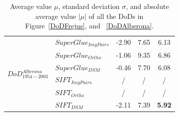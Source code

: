 \begin{table}
\begin{tabular}{||l|l|c|c|c||}
		\multirow{6}{*}{$DoD^{Alberona}_{1954-2003}$}
&${SuperGlue_{ImgPairs}}$ & -2.90 & 7.65 & 6.13\\
&${SuperGlue_{Ortho}}$ & -1.06 & 9.35 & 6.86\\
&${SuperGlue_{DSM}}$ & -0.46 & 7.70 & 6.08\\
&${SIFT_{ImgPairs}}$ & / & / & / \\
&${SIFT_{Ortho}}$ & / & / & / \\
&${SIFT_{DSM}}$ & -2.11 & 7.39 & \textbf{5.92}\\\hline
	\end{tabular}
	\caption{Average value $\mu$, standard deviation $\sigma$, and absolute average value $|\mu|$ of all the \ac{DoD}s in Figure~\ref{DoDFrejus}, and ~\ref{DoDAlberona}.}
	\label{RoughDoDStatistic}
\end{table}


